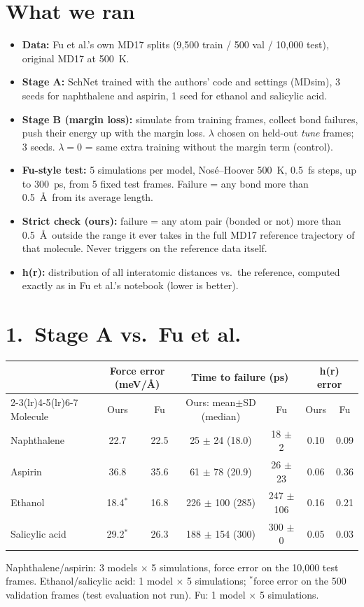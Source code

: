 \documentclass[10pt]{article}
\begin{document}
\section*{What we ran}
\begin{itemize}
  \item \textbf{Data:} Fu et al.'s own MD17 splits (9,500 train / 500 val / 10,000 test), original MD17 at 500~K.
  \item \textbf{Stage A:} SchNet trained with the authors' code and settings (MDsim), 3 seeds for naphthalene
        and aspirin, 1 seed for ethanol and salicylic acid.
  \item \textbf{Stage B (margin loss):} simulate from training frames, collect bond failures, push their energy
        up with the margin loss. $\lambda$ chosen on held-out \emph{tune} frames; 3 seeds.
        $\lambda{=}0$ = same extra training without the margin term (control).
  \item \textbf{Fu-style test:} 5 simulations per model, Nos\'e--Hoover 500~K, 0.5~fs steps, up to 300~ps,
        from 5 fixed test frames. Failure = any bond more than 0.5~\AA\ from its average length.
  \item \textbf{Strict check (ours):} failure = any atom pair (bonded or not) more than 0.5~\AA\ outside the
        range it ever takes in the full MD17 reference trajectory of that molecule. Never triggers on the reference data itself.
  \item \textbf{h(r):} distribution of all interatomic distances vs.\ the reference, computed exactly as in
        Fu et al.'s notebook (lower is better).
\end{itemize}

\section*{1.\ Stage A vs.\ Fu et al.}
\begin{center}
\begin{tabular}{lcccccc}
\toprule
 & \multicolumn{2}{c}{Force error (meV/\AA)} & \multicolumn{2}{c}{Time to failure (ps)} & \multicolumn{2}{c}{h(r) error} \\
\cmidrule(lr){2-3}\cmidrule(lr){4-5}\cmidrule(lr){6-7}
Molecule & Ours & Fu & Ours: mean$\pm$SD (median) & Fu & Ours & Fu \\
\midrule
Naphthalene    & 22.7 & 22.5 & 25 $\pm$ 24 (18.0) & 18 $\pm$ 2 & 0.10 & 0.09 \\
Aspirin        & 36.8 & 35.6 & 61 $\pm$ 78 (20.9) & 26 $\pm$ 23 & 0.06 & 0.36 \\
Ethanol        & 18.4$^*$ & 16.8 & 226 $\pm$ 100 (285) & 247 $\pm$ 106 & 0.16 & 0.21 \\
Salicylic acid & 29.2$^*$ & 26.3 & 188 $\pm$ 154 (300) & 300 $\pm$ 0 & 0.05 & 0.03 \\
\bottomrule
\end{tabular}
\end{center}
{\small Naphthalene/aspirin: 3 models $\times$ 5 simulations, force error on the 10,000 test frames.
Ethanol/salicylic acid: 1 model $\times$ 5 simulations; $^*$force error on the 500 validation frames (test evaluation not run).
Fu: 1 model $\times$ 5 simulations.}
\end{document}
